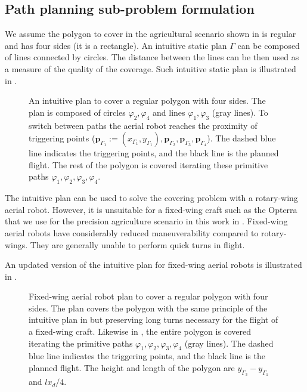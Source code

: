 \subsection{Path planning sub-problem formulation}
\label{sec:path-wise}

We assume the polygon to cover in the agricultural scenario shown in  is regular and has four sides (it is a rectangle). An intuitive static plan $\Gamma$ can be composed of lines connected by circles. The distance between the lines can be then used as a measure of the quality of the coverage. Such intuitive static plan is illustrated in .

\begin{figure}[h]
  \centering
  
  \caption[Intuitive plan to cover a regular polygon with four sides]{An intuitive plan to cover a regular polygon with four sides. The plan is composed of circles $\varphi_2,\varphi_4$ and lines $\varphi_1,\varphi_3$ (gray lines). To switch between paths the aerial robot reaches the proximity of triggering points ($\mathbf{p}_{\Gamma_1}:=(x_{\Gamma_1},y_{\Gamma_1}),\mathbf{p}_{\Gamma_2},\mathbf{p}_{\Gamma_3},\mathbf{p}_{\Gamma_4}$). The dashed blue line indicates the triggering points, and the black line is the planned flight. The rest of the polygon is covered iterating these primitive paths $\varphi_1,\varphi_2,\varphi_3,\varphi_4$.}
  \label{fig:plot3}
\end{figure}

The intuitive plan can be used to solve the covering problem with a rotary-wing aerial robot. However, it is unsuitable for a fixed-wing craft such as the Opterra that we use for the precision agriculture scenario in this work in . Fixed-wing aerial robots have considerably reduced maneuverability compared to rotary-wings. They are generally unable to perform quick turns in flight.

An updated version of the intuitive plan for fixed-wing aerial robots is illustrated in .

\begin{figure}[p!]
  \centering
  
  \caption[Fixed-wing aerial robot's plan to cover a regular polygon with four sides]{Fixed-wing aerial robot plan to cover a regular polygon with four sides. The plan covers the polygon with the same principle of the intuitive plan in  but preserving long turns necessary for the flight of a fixed-wing craft. Likewise in , the entire polygon is covered iterating the primitive paths $\varphi_1,\varphi_2,\varphi_3,\varphi_4$ (gray lines). The dashed blue line indicates the triggering points, and the black line is the planned flight. The height and length of the polygon are $y_{\Gamma_3}-y_{\Gamma_1}$ and $lx_d/4$.}
  \label{fig:plot4}
\end{figure}

